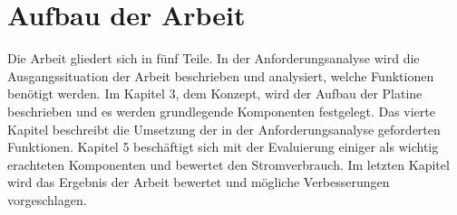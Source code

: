 


\section{Aufbau der Arbeit}
Die Arbeit gliedert sich in fünf Teile. 
In der Anforderungsanalyse wird die Ausgangssituation der Arbeit beschrieben und
analysiert, welche Funktionen benötigt werden. Im Kapitel 3, dem Konzept,
wird der Aufbau der Platine beschrieben und es werden grundlegende Komponenten
festgelegt. Das vierte Kapitel beschreibt die Umsetzung der in der Anforderungsanalyse
geforderten Funktionen. Kapitel 5 beschäftigt sich mit der Evaluierung einiger
als wichtig erachteten Komponenten und bewertet den Stromverbrauch.
Im letzten Kapitel wird das Ergebnis der Arbeit bewertet und mögliche Verbesserungen
vorgeschlagen.




